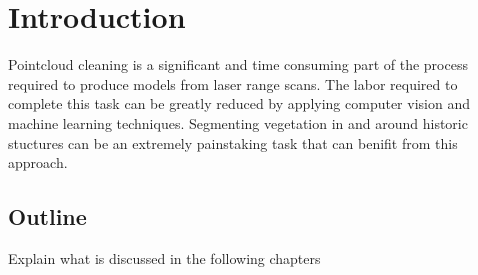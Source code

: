 \chapter{Introduction}
Pointcloud cleaning is a significant and time consuming part of the process required to produce models from laser range scans. The labor required to complete this task can be greatly reduced by applying computer vision and machine learning techniques. Segmenting vegetation in and around historic stuctures can be an extremely painstaking task that can benifit from this approach.



\section{Outline}
Explain what is discussed in the following chapters

